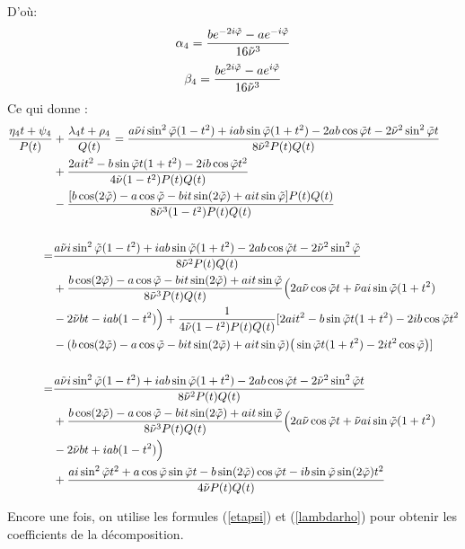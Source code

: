 D'où:
$$\alpha_4=\frac{be^{-2i\tilde{\varphi}}-ae^{-i\tilde{\varphi}}}{16\tilde{\nu}^3}$$
$$\beta_4=\frac{be^{2i\tilde{\varphi}}-ae^{i\tilde{\varphi}}}{16\tilde{\nu}^3}$$
Ce qui donne :
\begin{equation*}
\begin{split}
\frac{\eta_4 t+\psi_4}{P(t)}&+\frac{\lambda_4 t +\rho_4}{Q(t)}=\frac{a\tilde{\nu} i\sin^2\tilde{\varphi}(1-t^2)+iab\sin\tilde{\varphi}(1+t^2)-2ab\cos\tilde{\varphi}t-2\tilde{\nu}^2\sin^2\tilde{\varphi}t}{8\tilde{\nu}^2P(t)Q(t)}\\
&+\frac{2ait^2-b\sin\tilde{\varphi}t(1+t^2)-2ib\cos\tilde{\varphi}t^2}{4\tilde{\nu}(1-t^2)P(t)Q(t)}\\
&-\frac{\lbrack b\cos(2\tilde{\varphi})-a\cos\tilde{\varphi}-bit\sin(2\tilde{\varphi})+ait\sin\tilde{\varphi}\rbrack P(t)Q(t)}{8\tilde{\nu}^3(1-t^2)P(t)Q(t)} \\
~\\
=&\frac{a\tilde{\nu} i\sin^2\tilde{\varphi}(1-t^2)+iab\sin\tilde{\varphi}(1+t^2)-2ab\cos\tilde{\varphi}t-2\tilde{\nu}^2\sin^2\tilde{\varphi}}{8\tilde{\nu}^2P(t)Q(t)} \\
&+\frac{b\cos(2\tilde{\varphi})-a\cos\tilde{\varphi}-bit\sin(2\tilde{\varphi})+ait\sin\tilde{\varphi}}{8\tilde{\nu}^3P(t)Q(t)}\Big(2a\tilde{\nu}\cos\tilde{\varphi}t+\tilde{\nu} ai\sin\tilde{\varphi}(1+t^2)\\
&-2\tilde{\nu} bt-iab(1-t^2)\Big)+\frac{1}{4\tilde{\nu}(1-t^2)P(t)Q(t)} \lbrack 2ait^2-b\sin\tilde{\varphi}t(1+t^2)-2ib\cos\tilde{\varphi}t^2\\
&-(b\cos(2\tilde{\varphi})-a\cos\tilde{\varphi}-bit\sin(2\tilde{\varphi})+ait\sin\tilde{\varphi})\big(\sin\tilde{\varphi}t(1+t^2)-2it^2\cos\tilde{\varphi}\big) \rbrack \\
~\\
=&\frac{a\tilde{\nu} i\sin^2\tilde{\varphi}(1-t^2)+iab\sin\tilde{\varphi}(1+t^2)-2ab\cos\tilde{\varphi}t-2\tilde{\nu}^2\sin^2\tilde{\varphi}t}{8\tilde{\nu}^2P(t)Q(t)} \\
&+\frac{b\cos(2\tilde{\varphi})-a\cos\tilde{\varphi}-bit\sin(2\tilde{\varphi})+ait\sin\tilde{\varphi}}{8\tilde{\nu}^3P(t)Q(t)}\Big(2a\tilde{\nu}\cos\tilde{\varphi}t+\tilde{\nu} ai\sin\tilde{\varphi}(1+t^2)\\
&-2\tilde{\nu} bt+iab(1-t^2)\Big)\\
&+\frac{ai\sin^2\tilde{\varphi} t^2+a\cos\tilde{\varphi} \sin\tilde{\varphi} t-b\sin(2\tilde{\varphi})\cos\tilde{\varphi} t-ib\sin\tilde{\varphi}\sin(2\tilde{\varphi})t^2}{4\tilde{\nu} P(t)Q(t)} 
\end{split}
\end{equation*}

Encore une fois, on utilise les formules (\ref{etapsi}) et (\ref{lambdarho}) pour obtenir les coefficients de la décomposition.

